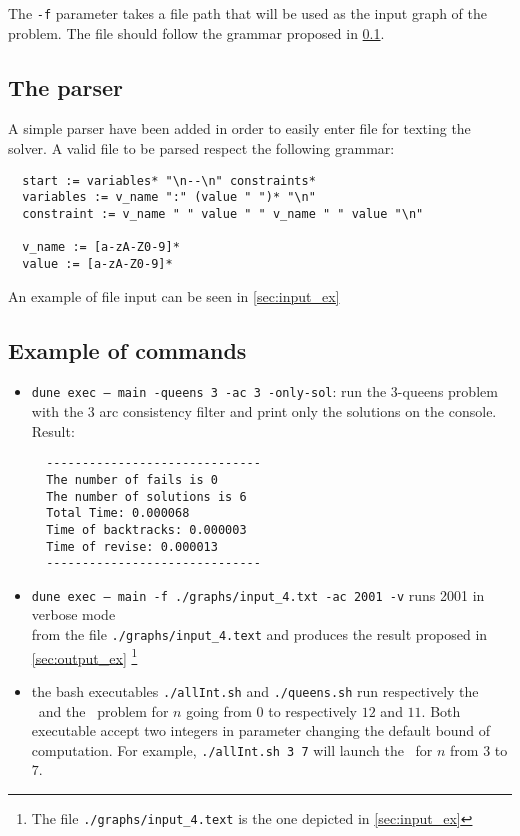 \documentclass{rapport}
\begin{document}
The \texttt{-f} parameter takes a file path that will be used as the input graph of the problem. The file should follow the grammar proposed in \cref{sec:parser}.

\subsection{The parser}
\label{sec:parser}

A simple parser have been added in order to easily enter file for texting the solver. A valid file to be parsed respect the following grammar:

\begin{verbatim}
  start := variables* "\n--\n" constraints*
  variables := v_name ":" (value " ")* "\n"  
  constraint := v_name " " value " " v_name " " value "\n"

  v_name := [a-zA-Z0-9]*
  value := [a-zA-Z0-9]*
\end{verbatim}

An example of file input can be seen in \cref{sec:input_ex}


\subsection{Example of commands}

\begin{itemize}
  \item \texttt{dune exec -- main -queens 3 -ac 3 -only-sol}: run the 3-queens problem with the \ac{3} arc consistency filter and print only the solutions on the console. Result:\\
        \begin{verbatim}
  ------------------------------
  The number of fails is 0
  The number of solutions is 6
  Total Time: 0.000068
  Time of backtracks: 0.000003
  Time of revise: 0.000013
  ------------------------------
  \end{verbatim}

  \item \texttt{dune exec -- main -f ./graphs/input\_4.txt -ac 2001 -v} runs \ac{2001} in verbose mode \\ from the file \texttt{./graphs/input\_4.text} and produces the result proposed in \cref{sec:output_ex} \footnote{The file \texttt{./graphs/input\_4.text} is the one depicted in \cref{sec:input_ex}}

  \item the bash executables \texttt{./allInt.sh} and \texttt{./queens.sh} run respectively the \allint\ and the \queens\ problem for $n$ going from $0$ to respectively $12$ and $11$. Both executable accept two integers in parameter changing the default bound of computation. For example, \texttt{./allInt.sh 3 7} will launch the \allint\ for $n$ from $3$ to $7$.

\end{itemize}
\end{document}
